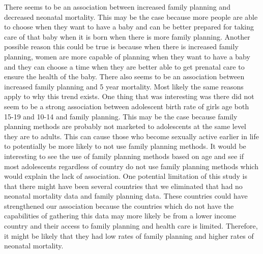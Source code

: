 \documentclass[
  letterpaper,
  DIV=11,
  numbers=noendperiod]{scrartcl}
\begin{document}
There seems to be an association between increased family planning and
decreased neonatal mortality. This may be the case because more people
are able to choose when they want to have a baby and can be better
prepared for taking care of that baby when it is born when there is more
family planning. Another possible reason this could be true is because
when there is increased family planning, women are more capable of
planning when they want to have a baby and they can choose a time when
they are better able to get prenatal care to ensure the health of the
baby. There also seems to be an association between increased family
planning and 5 year mortality. Most likely the same reasons apply to why
this trend exists. One thing that was interesting was there did not seem
to be a strong association between adolescent birth rate of girls age
both 15-19 and 10-14 and family planning. This may be the case because
family planning methods are probably not marketed to adolescents at the
same level they are to adults. This can cause those who become sexually
active earlier in life to potentially be more likely to not use family
planning methods. It would be interesting to see the use of family
planning methods based on age and see if most adolescents regardless of
country do not use family planning methods which would explain the lack
of association. One potential limitation of this study is that there
might have been several countries that we eliminated that had no
neonatal mortality data and family planning data. These countries could
have strengthened our association because the countries which do not
have the capabilities of gathering this data may more likely be from a
lower income country and their access to family planning and health care
is limited. Therefore, it might be likely that they had low rates of
family planning and higher rates of neonatal mortality.
\end{document}

